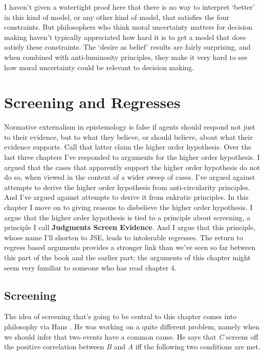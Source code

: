 I haven't given a watertight proof here that there is no way to interpret `better' in this kind of model, or any other kind of model, that satisfies the four constraints. But philosophers who think moral uncertainty matters for decision making haven't typically appreciated how hard it is to get a model that does satisfy these constraints. The `desire as belief' results are fairly surprising, and when combined with anti-luminosity principles, they make it very hard to see how moral uncertainty could be relevant to decision making.

\chapter{Screening and Regresses}
\label{screeningandregresses}

Normative externalism in epistemology is false if agents should respond not just to their evidence, but to what they believe, or should believe, about what their evidence supports. Call that latter claim the higher order hypothesis. Over the last three chapters I've responded to arguments for the higher order hypothesis. I argued that the cases that apparently support the higher order hypothesis do not do so, when viewed in the context of a wider sweep of cases. I've argued against attempts to derive the higher order hypothesis from anti-circularity principles. And I've argued against attempts to derive it from enkratic principles. In this chapter I move on to giving reasons to disbelieve the higher order hypothesis. I argue that the higher order hypothesis is tied to a principle about screening, a principle I call \textbf{Judgments Screen Evidence}. And I argue that this principle, whose name I'll shorten to JSE, leads to intolerable regresses. The return to regress based arguments provides a stronger link than we've seen so far between this part of the book and the earlier part; the arguments of this chapter might seem very familiar to someone who has read chapter 4.

\section{Screening}
\label{screening}

The idea of screening that's going to be central to this chapter comes into philosophy via Hans \citet{Reichenbach1956}. He was working on a quite different problem, namely when we should infer that two events have a common cause. He says that \emph{C} screens off the positive correlation between \emph{B} and \emph{A} iff the following two conditions are met.

